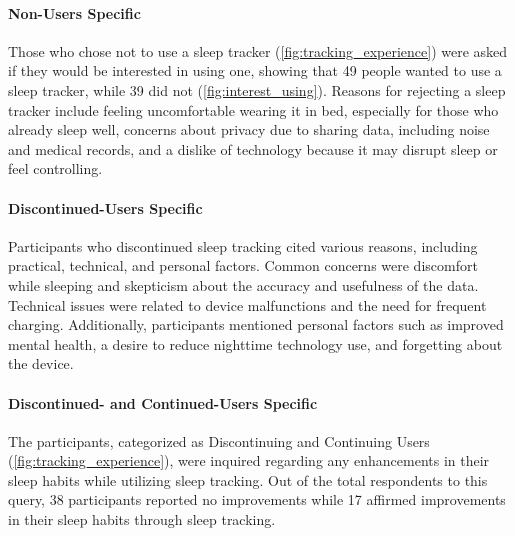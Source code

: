 \documentclass[
  a4paper,  %
  twoside,  %
  bibliography=totoc,
  headsepline,
  cleardoublepage=empty,
  parskip=half,
  draft=false
]{scrbook}
\begin{document}
\paragraph{Non-Users Specific}
Those who chose not to use a sleep tracker (\autoref{fig:tracking_experience}) were asked if they would be interested in using one, showing that 49 people wanted to use a sleep tracker, while 39 did not (\autoref{fig:interest_using}). Reasons for rejecting a sleep tracker include feeling uncomfortable wearing it in bed, especially for those who already sleep well, concerns about privacy due to sharing data, including noise and medical records, and a dislike of technology because it may disrupt sleep or feel controlling.

\paragraph{Discontinued-Users Specific}
Participants who discontinued sleep tracking cited various reasons, including practical, technical, and personal factors. Common concerns were discomfort while sleeping and skepticism about the accuracy and usefulness of the data. Technical issues were related to device malfunctions and the need for frequent charging. Additionally, participants mentioned personal factors such as improved mental health, a desire to reduce nighttime technology use, and forgetting about the device.

\paragraph{Discontinued- and Continued-Users Specific}
The participants, categorized as Discontinuing and Continuing Users (\autoref{fig:tracking_experience}), were inquired regarding any enhancements in their sleep habits while utilizing sleep tracking. Out of the total respondents to this query, 38 participants reported no improvements while 17 affirmed improvements in their sleep habits through sleep tracking.
\end{document}
